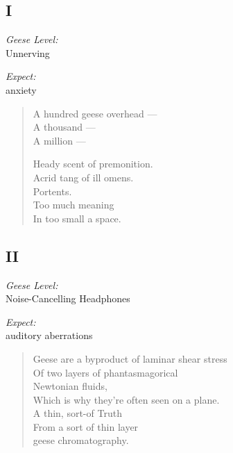 \subsection*{I}
\noindent\begin{paracol}{2}
    \begin{flushright}
      \textit{Geese Level:} \\
      Unnerving

      \textit{Expect:}\\
      anxiety
    \end{flushright}
    \switchcolumn
    \begin{verse}
      A hundred geese overhead --- \\
      \vin A thousand --- \\
      \vin \vin A million ---

      Heady scent of premonition. \\
      Acrid tang of ill omens. \\
      Portents.\\
      Too much meaning \\
      \vin In too small a space.
    \end{verse}
\end{paracol}

\newpage

\null
\vspace{1cm}

\subsection*{II}
\noindent\begin{paracol}{2}
    \begin{flushright}
      \textit{Geese Level:} \\
      Noise-Cancelling Headphones

      \textit{Expect:}\\
      auditory aberrations
    \end{flushright}
    \switchcolumn
    \begin{verse}
      Geese are a byproduct of laminar shear stress \\
      \vin Of two layers of phantasmagorical\\
      \vin \vin Newtonian fluids, \\
      \vin Which is why they’re often seen on a plane. \\
      A thin, sort-of Truth \\
      \vin From a sort of thin layer \\
      \vin \vin geese chromatography.
    \end{verse}
\end{paracol}

